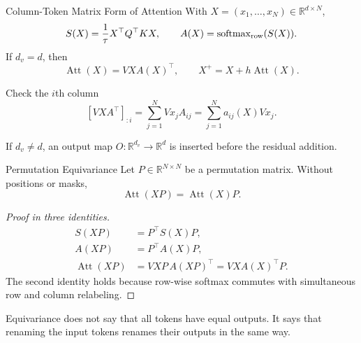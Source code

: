 \documentclass[aspectratio=169,11pt]{beamer}
\newcommand{\R}{\mathbb{R}}
\DeclareMathOperator{\Att}{Att}
\begin{document}
\begin{frame}{Column-Token Matrix Form of Attention}
With $X=(x_1,\ldots,x_N)\in\R^{d\times N}$,
\[
 S(X)=\frac1\tau X^\top Q^\top KX,
 \qquad A(X)=\operatorname{softmax}_{\rm row}(S(X)).
\]
If $d_v=d$, then
\[
  \Att(X)=VXA(X)^\top,
  \qquad X^+=X+h\Att(X).
\]

\begin{block}{Check the $i$th column}
\[
 [VXA^\top]_{:i}=\sum_{j=1}^N Vx_j A_{ij}
 =\sum_{j=1}^N a_{ij}(X)Vx_j.
\]
\end{block}

If $d_v\neq d$, an output map $O:\R^{d_v}\to\R^d$ is inserted before the residual addition.
\end{frame}


\begin{frame}{Permutation Equivariance}
Let $P\in\R^{N\times N}$ be a permutation matrix.  Without positions or masks,
\[
 \boxed{\Att(XP)=\Att(X)P.}
\]

\begin{proof}[Proof in three identities]
\begin{align*}
 S(XP)&=P^\top S(X)P,\\
 A(XP)&=P^\top A(X)P,\\
 \Att(XP)&=VXP\,A(XP)^\top
          =VXA(X)^\top P.
\end{align*}
The second identity holds because row-wise softmax commutes with simultaneous row and column relabeling.
\end{proof}

Equivariance does not say that all tokens have equal outputs.  It says that renaming the input tokens renames their outputs in the same way.
\end{frame}
\end{document}
